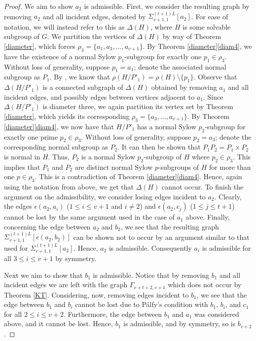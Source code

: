 \documentclass[11pt]{amsart}
\theoremstyle{definition}
\theoremstyle{remark}
\numberwithin{equation}{section}
\newcommand{\SLi}[3]{\Sigma_{#1,#2}^{#3L}} %
\begin{document}
\begin{proof}
We aim to show $a_2$ is admissible. First, we consider the resulting graph by removing $a_2$ and all incident edges, denoted by $\SLi{v+1}{1}{(t+1)}[a_2]$. For ease of notation, we will instead refer to this as $\Delta(H)$, where $H$ is some solvable subgroup of $G$. We partition the vertices of $\Delta(H)$ by way of Theorem \ref{diameter}, which forces $\rho_3 = \{a_1,a_3,\ldots,a_{v+1}\}$. By Theorem \ref{diameter}\eqref{diam4}, we have the existence of a normal Sylow $p_1$-subgroup for exactly one $p_1 \in \rho_3$. Without loss of generality, suppose $p_1 = a_1$; denote the associated normal subgroup as $P_1$. By \cite{L2.5}, we know that $\rho(H/P'_1) = \rho(H) \setminus \{p_1\}$. Observe that $\Delta(H/P'_1)$ is a connected subgraph of $\Delta(H)$ obtained by removing $a_1$ and all incident edges, and possibly edges between vertices adjacent to $a_1$. Since $\Delta(H/P'_1)$ is diameter three, we again partition its vertex set by Theorem \ref{diameter}, which yields its corresponding $\rho_3 = \{a_3,\ldots,a_{v+1}\}$. By Theorem \ref{diameter}\eqref{diam4}, we now have that $H/P'_1$ has a normal Sylow $p_2$-subgroup for exactly one prime $p_2 \in \rho_3$. Without loss of generality, suppose $p_2 = a_3$; denote the corresponding normal subgroup as $P_2$. It can then be shown that $P_1P_2 = P_1 \times P_2$ is normal in $H$. Thus, $P_2$ is a normal Sylow $p_2$-subgroup of $H$ where $p_2 \in \rho_3$. This implies that $P_1$ and $P_2$ are distinct normal Sylow $p$-subgroups of $H$ for more than one $p \in \rho_3$. This is a contradiction of Theorem \ref{diameter}\eqref{diam4}. Hence, again using the notation from above, we get that $\Delta(H)$ cannot occur. To finish the argument on the admissibility, we consider losing edges incident to $a_2$. Clearly, the edges $\epsilon(a_2,a_i)$ ($1 \leq i \leq v+1$ and $i\neq2$) and $\epsilon(a_2,c_j)$ ($1 \leq j\leq t+1$) cannot be lost by the same argument used in the case of $a_1$ above. Finally, concerning the edge between $a_2$ and $b_2$, we see that the resulting graph $\SLi{v+1}{1}{(t+1)}[\epsilon(a_2,b_2)]$ can be shown not to occur by an argument similar to that used for $\SLi{v+1}{1}{(t+1)}[a_2]$. Hence, $a_2$ is admissible. Consequently $a_i$ is admissible for all $3 \leq i \leq v+1$ by symmetry.

Next we aim to show that $b_1$ is admissible. Notice that by removing $b_1$ and all incident edges we are left with the graph $\Gamma_{v+t+2,v+1}$ which does not occur by Theorem \ref{KT}. Considering, now, removing edges incident to $b_1$, we see that the edge between $b_1$ and $b_i$ cannot be lost due to P\'alfy's condition with $b_1$, $b_i$, and $c_1$ for all $2\leq i\leq v+2$. Furthermore, the edge between $b_1$ and $a_1$ was considered above, and it cannot be lost. Hence, $b_1$ is admissible, and by symmetry, so is $b_{v+2}$.


\end{proof}
\end{document}
